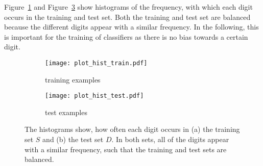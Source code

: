 Figure~\ref{fig:plot_hist_train} and Figure~\ref{fig:plot_hist_test} show histograms of the frequency, with which each digit occurs in the training and test set. Both the training and test set are balanced because the different digits appear with a similar frequency. In the following, this is important for the training of classifiers as there is no bias towards a certain digit. 

\begin{figure}[h!]
    \begin{subfigure}[t]{0.5\textwidth}
        \centering
        \texttt{[image: plot\_hist\_train.pdf]} 
        \caption{training examples} \label{fig:plot_hist_train}
    \end{subfigure}
    \hfill
    \begin{subfigure}[t]{0.5\textwidth}
        \centering
        \texttt{[image: plot\_hist\_test.pdf]} 
        \caption{test examples} \label{fig:plot_hist_test}
    \end{subfigure}
    \caption{The histograms show, how often each digit occurs in (a) the training set $S$ and (b) the test set $D$. In both sets, all of the digits appear with a similar frequency, such that the training and test sets are balanced.}
\end{figure}


